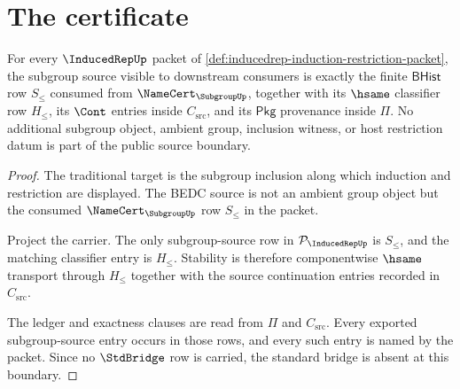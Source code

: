 \section{The certificate}
\label{sec:inducedrep-certificate}

\begin{theorem}
\label{thm:inducedrep-subgroup-source-boundary}
For every $\InducedRepUp$ packet of
\autoref{def:inducedrep-induction-restriction-packet}, the subgroup source
visible to downstream consumers is exactly the finite $\mathsf{BHist}$ row
$S_{\leq}$ consumed from $\NameCert_{\SubgroupUp}$, together with its
$\hsame$ classifier row $H_{\leq}$, its $\Cont$ entries inside
$C_{\mathrm{src}}$, and its $\mathsf{Pkg}$ provenance inside $\Pi$. No
additional subgroup object, ambient group, inclusion witness, or host
restriction datum is part of the public source boundary.
\end{theorem}
\begin{proof}
The traditional target is the subgroup inclusion along which induction and
restriction are displayed. The BEDC source is not an ambient group object but
the consumed $\NameCert_{\SubgroupUp}$ row $S_{\leq}$ in the packet.

Project the carrier. The only subgroup-source row in
$\mathcal{P}_{\InducedRepUp}$ is $S_{\leq}$, and the matching classifier
entry is $H_{\leq}$. Stability is therefore componentwise $\hsame$ transport
through $H_{\leq}$ together with the source continuation entries recorded in
$C_{\mathrm{src}}$.

The ledger and exactness clauses are read from $\Pi$ and $C_{\mathrm{src}}$.
Every exported subgroup-source entry occurs in those rows, and every such
entry is named by the packet. Since no $\StdBridge$ row is carried, the
standard bridge is absent at this boundary.
\end{proof}

